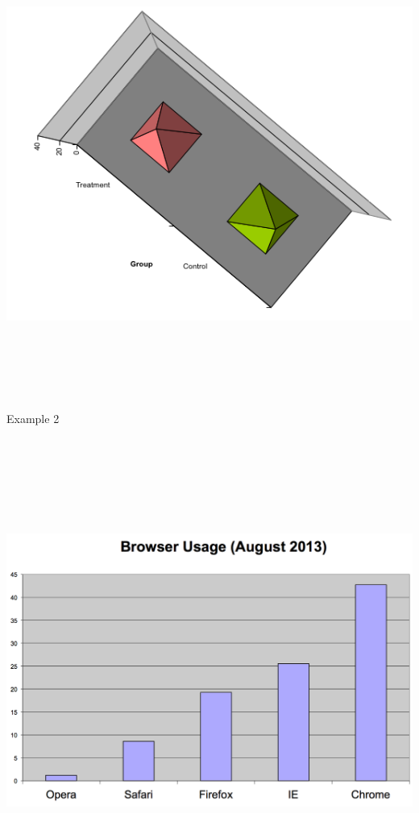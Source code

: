 \documentclass[12pt]{article}
\newcommand{\headsize}{\fontsize{35}{35} \selectfont}
\begin{document}
\centerline{\includegraphics[height=6in]{Figs/fig1h.png}}



\newpage


\headsize \color{yellow}
\hfill \begin{minipage}{5.75in}
\centering
Example 2
\end{minipage}

\vspace{30mm}

\centerline{\includegraphics[height=6in]{Figs/fig2a.png}}
\end{document}
